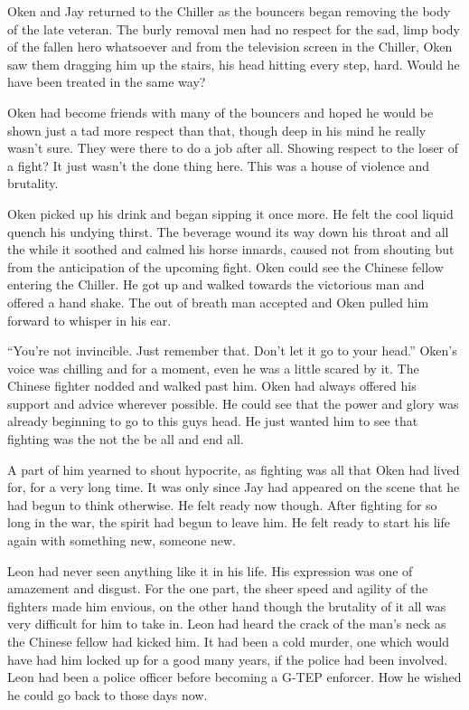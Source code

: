 Oken and Jay returned to the Chiller as the bouncers began removing the body of the late veteran.  The burly removal men had no respect for the sad, limp body of the fallen hero whatsoever and from the television screen in the Chiller, Oken saw them dragging him up the stairs, his head hitting every step, hard.  Would he have been treated in the same way?  

Oken had become friends with many of the bouncers and hoped he would be shown just a tad more respect than that, though deep in his mind he really wasn't sure.  They were there to do a job after all.  Showing respect to the loser of a fight?  It just wasn't the done thing here.  This was a house of violence and brutality.  

Oken picked up his drink and began sipping it once more.  He felt the cool liquid quench his undying thirst.  The beverage wound its way down his throat and all the while it soothed and calmed his horse innards, caused not from shouting but from the anticipation of the upcoming fight.  Oken could see the Chinese fellow entering the Chiller.  He got up and walked towards the victorious man and offered a hand shake.  The out of breath man accepted and Oken pulled him forward to whisper in his ear.

``You're not invincible.  Just remember that.  Don't let it go to your head.''  Oken's voice was chilling and for a moment, even he was a little scared by it.  The Chinese fighter nodded and walked past him.  Oken had always offered his support and advice wherever possible.  He could see that the power and glory was already beginning to go to this guys head.  He just wanted him to see that fighting was the not the be all and end all.  

A part of him yearned to shout hypocrite, as fighting was all that Oken had lived for, for a very long time.  It was only since Jay had appeared on the scene that he had begun to think otherwise.  He felt ready now though.  After fighting for so long in the war, the spirit had begun to leave him.  He felt ready to start his life again with something new, someone new.



\thoughtbreak



Leon had never seen anything like it in his life.  His expression was one of amazement and disgust.  For the one part, the sheer speed and agility of the fighters made him envious, on the other hand though the brutality of it all was very difficult for him to take in.  Leon had heard the crack of the man's neck as the Chinese fellow had kicked him.  It had been a cold murder, one which would have had him locked up for a good many years, if the police had been involved.  Leon had been a police officer before becoming a G-TEP enforcer.  How he wished he could go back to those days now.  

